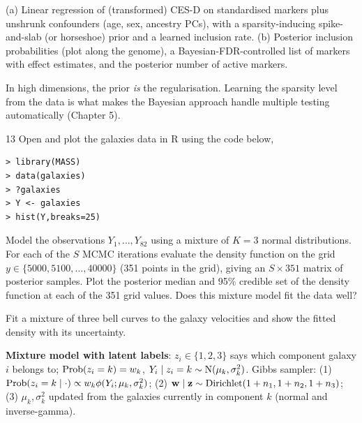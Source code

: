 \documentclass[11pt]{article}
\begin{document}
\begin{answer}
(a) Linear regression of (transformed) CES-D on standardised markers plus unshrunk confounders (age, sex, ancestry PCs), with a sparsity-inducing spike-and-slab (or horseshoe) prior and a learned inclusion rate. (b) Posterior inclusion probabilities (plot along the genome), a Bayesian-FDR-controlled list of markers with effect estimates, and the posterior number of active markers.
\end{answer}

\begin{takeaway}
In high dimensions, the prior \emph{is} the regularisation. Learning the sparsity level from the data is what makes the Bayesian approach handle multiple testing automatically (Chapter 5).
\end{takeaway}


\begin{problem}{13}
Open and plot the galaxies data in R using the code below,
\begin{lstlisting}
> library(MASS)
> data(galaxies)
> ?galaxies
> Y <- galaxies
> hist(Y,breaks=25)
\end{lstlisting}
Model the observations $Y_1,\dots,Y_{82}$ using a mixture of $K=3$ normal distributions. For each of the $S$ MCMC iterations evaluate the density function on the grid $y\in\{5000,5100,\dots,40000\}$ (351 points in the grid), giving an $S\times351$ matrix of posterior samples. Plot the posterior median and 95\% credible set of the density function at each of the 351 grid values. Does this mixture model fit the data well?
\end{problem}

\begin{restate}
Fit a mixture of three bell curves to the galaxy velocities and show the fitted density with its uncertainty.
\end{restate}

\begin{recall}
\textbf{Mixture model with latent labels}: $z_i\in\{1,2,3\}$ says which component galaxy $i$ belongs to; $\mathrm{Prob}(z_i=k)=w_k$, $Y_i\mid z_i=k\sim\mathrm{N}(\mu_k,\sigma_k^2)$. Gibbs sampler: (1) $\mathrm{Prob}(z_i=k\mid\cdot)\propto w_k\phi(Y_i;\mu_k,\sigma_k^2)$; (2) $\mathbf w\mid\mathbf z\sim\mathrm{Dirichlet}(1+n_1,1+n_2,1+n_3)$; (3) $\mu_k,\sigma_k^2$ updated from the galaxies currently in component $k$ (normal and inverse-gamma).
\end{recall}
\end{document}
